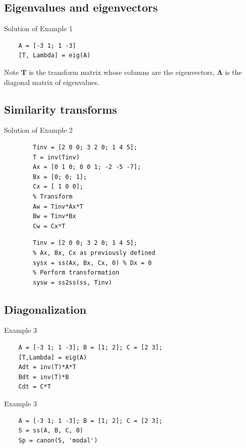 \subsection*{Eigenvalues and eigenvectors}

\begin{slide}
   Solution of Example 1
   \begin{verbatim}
	A = [-3 1; 1 -3]
	[T, Lambda] = eig(A)
   \end{verbatim}
	Note $\mathbf{T}$ is the transform matrix whose columns are the eigenvectors, $\mathbf{\Lambda}$ is the diagonal matrix of eigenvalues.
\end{slide}

\subsection*{Similarity transforms}

\begin{slide}
	Solution of Example 2
	\begin{verbatim}
		Tinv = [2 0 0; 3 2 0; 1 4 5];
		T = inv(Tinv)
		Ax = [0 1 0; 0 0 1; -2 -5 -7];
		Bx = [0; 0; 1];
		Cx = [ 1 0 0];
		% Transform
		Aw = Tinv*Ax*T
		Bw = Tinv*Bx
		Cw = Cx*T
	\end{verbatim}
\end{slide}

\begin{slide}
	\begin{verbatim}
		Tinv = [2 0 0; 3 2 0; 1 4 5];
		% Ax, Bx, Cx as previously defined
		sysx = ss(Ax, Bx, Cx, 0) % Dx = 0
		% Perform transformation
		sysw = ss2ss(ss, Tinv)
	\end{verbatim}
\end{slide}


\subsection*{Diagonalization}

\begin{slide}
Example 3
\begin{verbatim}
	A = [-3 1; 1 -3]; B = [1; 2]; C = [2 3];
	[T,Lambda] = eig(A)
	Adt = inv(T)*A*T
	Bdt = inv(T)*B
	Cdt = C*T
\end{verbatim}
\end{slide}

\begin{slide}
Example 3
\begin{verbatim}
	A = [-3 1; 1 -3]; B = [1; 2]; C = [2 3];
	S = ss(A, B, C, 0)
	Sp = canon(S, 'modal')
\end{verbatim}
\end{slide}



\endinput

